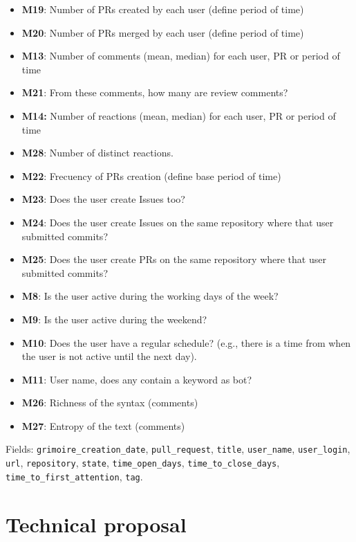 \documentclass[a4paper, 12pt]{book}
\begin{document}
\begin{itemize}
    \item \textbf{M19}: Number of PRs created by each user (define period of time)
    \item \textbf{M20}: Number of PRs merged by each user (define period of time)
    \item \textbf{M13}: Number of comments (mean, median) for each user, PR or period of time
    \item \textbf{M21}: From these comments, how many are review comments?
    \item \textbf{M14:} Number of reactions (mean, median) for each user, PR or period of time
    \item \textbf{M28}: Number of distinct reactions.
    \item \textbf{M22}: Frecuency of PRs creation (define base period of time)
    \item \textbf{M23}: Does the user create Issues too?
    \item \textbf{M24}: Does the user create Issues on the same repository where that user submitted commits?
    \item \textbf{M25}: Does the user create PRs on the same repository where that user submitted commits?
    \item \textbf{M8}: Is the user active during the working days of the week? 
    \item \textbf{M9}: Is the user active during the weekend?
    \item \textbf{M10}: Does the user have a regular schedule? (e.g., there is a time from when the user is not active until the next day).
    \item \textbf{M11}: User name, does any contain a keyword as bot? 
    \item \textbf{M26}: Richness of the syntax (comments)
    \item \textbf{M27}: Entropy of the text (comments)
\end{itemize}

Fields: \texttt{grimoire\_creation\_date}, \texttt{pull\_request}, \texttt{title}, \texttt{user\_name}, \texttt{user\_login}, \texttt{url}, \texttt{repository}, \texttt{state}, \texttt{time\_open\_days}, \texttt{time\_to\_close\_days}, \texttt{time\_to\_first\_attention}, \texttt{tag}.

\section{Technical proposal}
\end{document}
